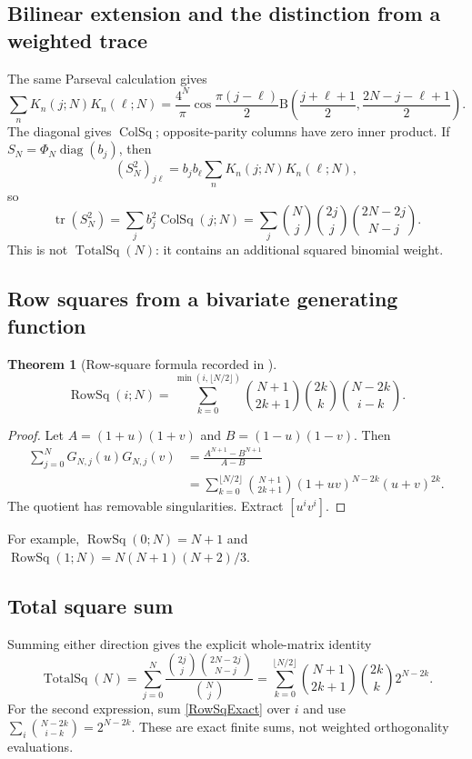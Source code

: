 \documentclass[11pt,reqno]{amsart}
\newtheorem{theorem}{Theorem}[section]
\theoremstyle{remark}\newtheorem{remark}[theorem]{Remark}
\DeclareMathOperator{\RowSq}{RowSq}
\DeclareMathOperator{\ColSq}{ColSq}
\DeclareMathOperator{\TotalSq}{TotalSq}
\begin{document}
\subsection{Bilinear extension and the distinction from a weighted trace}
The same Parseval calculation gives
\begin{equation}\label{bilinear}
\sum_nK_n(j;N)K_n(\ell;N)
=\frac{4^N}{\pi}\cos\frac{\pi(j-\ell)}2
\mathrm B\left(\frac{j+\ell+1}{2},\frac{2N-j-\ell+1}{2}\right).
\end{equation}
The diagonal gives $\ColSq$; opposite-parity columns have zero inner product. If $S_N=\Phi_N\operatorname{diag}(b_j)$, then
\[
(S_N^2)_{j\ell}=b_jb_\ell\sum_nK_n(j;N)K_n(\ell;N),
\]
so
\begin{equation}\label{traceS}
\operatorname{tr}(S_N^2)=\sum_jb_j^2\ColSq(j;N)
=\sum_j\binom Nj\binom{2j}{j}\binom{2N-2j}{N-j}.
\end{equation}
This is not $\TotalSq(N)$: it contains an additional squared binomial weight.

\subsection{Row squares from a bivariate generating function}
\begin{theorem}[Row-square formula recorded in \cite{Feinsilver2016}]\label{rowsquares}
\begin{equation}\label{RowSqExact}
\boxed{\RowSq(i;N)=\sum_{k=0}^{\min(i,\lfloor N/2\rfloor)}
\binom{N+1}{2k+1}\binom{2k}{k}\binom{N-2k}{i-k}.}
\end{equation}
\end{theorem}
\begin{proof}
Let $A=(1+u)(1+v)$ and $B=(1-u)(1-v)$. Then
\begin{align*}
\sum_{j=0}^NG_{N,j}(u)G_{N,j}(v)
&=\frac{A^{N+1}-B^{N+1}}{A-B}\\
&=\sum_{k=0}^{\lfloor N/2\rfloor}
\binom{N+1}{2k+1}(1+uv)^{N-2k}(u+v)^{2k}.
\end{align*}
The quotient has removable singularities. Extract $[u^iv^i]$.
\end{proof}
For example, $\RowSq(0;N)=N+1$ and $\RowSq(1;N)=N(N+1)(N+2)/3$.

\subsection{Total square sum}
Summing either direction gives the explicit whole-matrix identity
\begin{equation}\label{TotalSqExact}
\boxed{\TotalSq(N)=\sum_{j=0}^N
\frac{\binom{2j}{j}\binom{2N-2j}{N-j}}{\binom Nj}
=\sum_{k=0}^{\lfloor N/2\rfloor}
\binom{N+1}{2k+1}\binom{2k}{k}2^{N-2k}.}
\end{equation}
For the second expression, sum \eqref{RowSqExact} over $i$ and use $\sum_i\binom{N-2k}{i-k}=2^{N-2k}$. These are exact finite sums, not weighted orthogonality evaluations.
\end{document}
